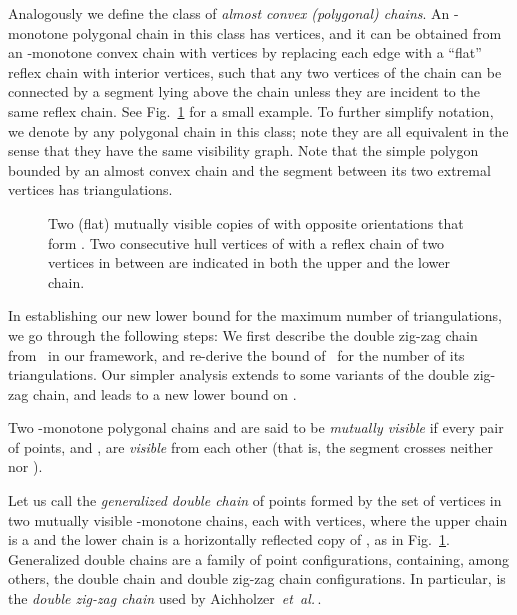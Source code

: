 \documentclass[11pt]{article}
\def\etal{{\it et~al.}\,}
\begin{document}
Analogously we define the class  of {\em almost convex (polygonal) chains}.
An -monotone polygonal chain in this class has 
vertices, and it can be obtained from an -monotone convex chain
with  vertices by replacing each edge with a ``flat'' reflex
chain with  interior vertices, such that any two vertices of the
chain can be connected by a segment lying above the chain unless they are incident
to the same reflex chain. See Fig.~\ref{f6} for a small example.
To further simplify notation,
we denote by  any polygonal chain in this class; note they are all equivalent
in the sense that they have the same visibility graph. Note that the simple polygon
bounded by an almost convex chain  and the segment between its two extremal
vertices has  triangulations.
\begin{figure}[htbp]
\centerline{\epsfysize=1.4in }
\caption{Two (flat) mutually visible copies of 
with opposite orientations that form . Two consecutive
hull vertices of  with a reflex chain of two vertices in
between are indicated in both the upper and the lower chain.}
\label{f6}
\end{figure}


In establishing our new lower bound for the maximum number of triangulations,
we go through the following steps: We first describe the double zig-zag chain
from~\cite{AHV+06} in our framework, and re-derive the 
bound of~\cite{AHV+06} for the number of its triangulations. Our simpler analysis
extends to some variants of the double zig-zag chain, and leads to a new
lower bound on .

Two -monotone polygonal chains  and  are said to be {\em mutually
visible} if every pair of points,  and , are {\em visible}
from each other (that is, the segment  crosses neither  nor ).

Let us call  the {\em generalized double chain} of  points formed by
the set of vertices in two mutually visible -monotone chains, each
with  vertices, where the upper chain is a  and
the lower chain is a horizontally reflected copy of ,
as in Fig.~\ref{f6}. Generalized double chains are a family of point configurations,
containing, among others, the double chain and double zig-zag chain configurations.
In particular,  is the \emph{double zig-zag chain} used
by Aichholzer~\etal\cite{AHV+06}.
\end{document}
